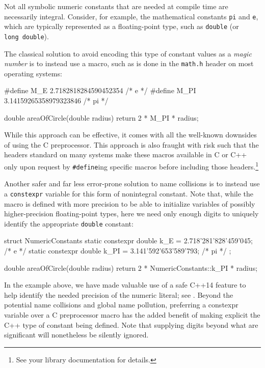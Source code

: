 Not all symbolic numeric constants that are needed at compile time are
necessarily integral. Consider, for example, the mathematical constants
\lstinline!pi! and \lstinline!e!, which are typically represented as a
floating-point type, such as \lstinline!double! (or
\lstinline!long!~\lstinline!double!).

The classical solution to avoid encoding this type of constant values as
a \emph{magic number} is to instead use a macro, such as is done in the
\lstinline!math.h! header on most operating systems:

\begin{emcppslisting}
#define M_E   2.7182818284590452354  /* e */
#define M_PI  3.14159265358979323846 /* pi */

double areaOfCircle(double radius)
{
    return 2 * M_PI * radius;
}
\end{emcppslisting}
    
\noindent While this approach can be effective, it comes with all the well-known
downsides of using the C preprocessor. This approach is also fraught
with risk such that the headers standard on many systems make these
macros available in C or C++ only upon request by \lstinline!#define!ing
specific macros before including those headers.\footnote{See your library
documentation for details.}

Another safer and far less error-prone solution to name collisions is to
instead use a \lstinline!constexpr! variable for this form of nonintegral
constant. Note that, while the macro is defined with more precision to
be able to initialize variables of possibly higher-precision
floating-point types, here we need only enough digits to uniquely
identify the appropriate \lstinline!double! constant:

\begin{emcppslisting}[emcppsstandards={c++14}]
struct NumericConstants
{
    static constexpr double k_E  = 2.718'281'828'459'045;  /* e */
    static constexpr double k_PI = 3.141'592'653'589'793;  /* pi */
};

double areaOfCircle(double radius)
{
    return 2 * NumericConstants::k_PI * radius;
}
\end{emcppslisting}
    
\noindent In the example above, we have made valuable use of a safe C++14
feature to help identify the needed precision of the numeric literal;
see . Beyond the potential name
collisions and global name pollution, preferring a constexpr variable
over a C preprocessor macro has the added benefit of making explicit the
C++ type of constant being defined. Note that supplying digits beyond
what are significant will nonetheless be silently ignored.

